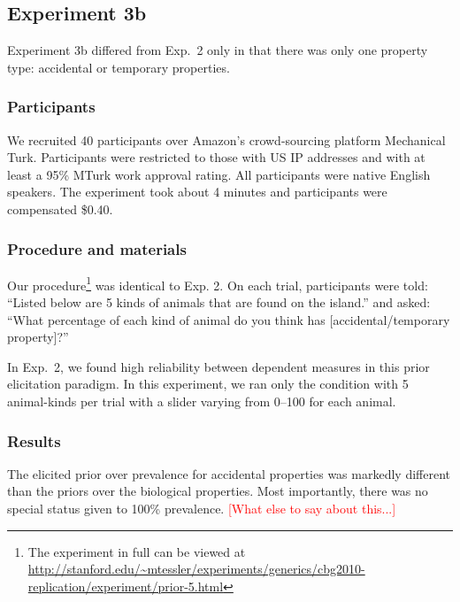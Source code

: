 \documentclass[10pt,letterpaper]{article}
\newcommand{\red}[1]{\textcolor{Red}{#1}}
\begin{document}
\subsection{Experiment 3b}

Experiment 3b differed from Exp.~2 only in that there was only one property type: accidental or temporary properties. 

\subsubsection{Participants}

We recruited 40 participants over Amazon's crowd-sourcing platform Mechanical Turk. Participants were restricted to those with US IP addresses and with at least a 95\% MTurk work approval rating. All participants were native English speakers. The experiment took about 4 minutes and participants were compensated \$0.40.

\subsubsection{Procedure and materials}

Our procedure\footnote{The experiment in full can be viewed at \url{http://stanford.edu/~mtessler/experiments/generics/cbg2010-replication/experiment/prior-5.html}} was identical to Exp. 2. On each trial, participants were told: ``Listed below are 5 kinds of animals that are found on the island.'' and asked: ``What percentage of each kind of animal do you think has [accidental/temporary property]?'' 

In Exp.~2, we found high reliability between dependent measures in this prior elicitation paradigm. In this experiment, we ran only the condition with 5 animal-kinds per trial with a slider varying from 0--100 for each animal.


\subsubsection{Results}


The elicited prior over prevalence for accidental properties was markedly different than the priors over the biological properties. Most importantly, there was no special status given to 100\% prevalence. \red{[What else to say about this...]}
\end{document}
